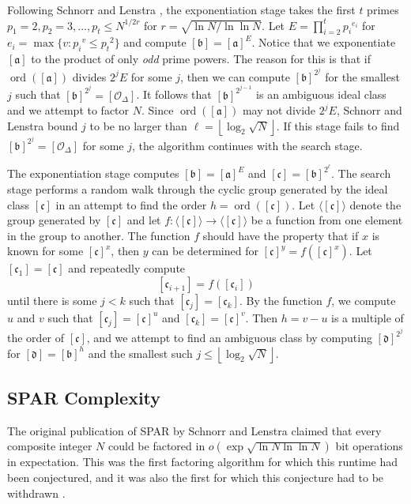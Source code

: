 \documentclass{ucalgthes1}
\theoremstyle{definition}
\DeclareMathOperator{\ord}{ord}
\newcommand{\floor}[1]{\left\lfloor #1 \right\rfloor}
\newcommand{\ideal}{\mathfrak}
\newcommand{\idealclass}[1]{\left[ \ideal #1 \right]}
\newcommand{\aclass}{\idealclass a}
\newcommand{\bclass}{\idealclass b}
\newcommand{\cclass}{\idealclass c}
\newcommand{\dclass}{\idealclass d}
\newcommand{\idclass}{[\mathcal O_\Delta]}
\begin{document}
Following Schnorr and Lenstra \cite{Schnorr1984}, the exponentiation stage takes the first $t$ primes $p_1 = 2, p_2 = 3, ..., p_t \le N^{1/2r}$ for $r = \sqrt{\ln N / \ln \ln N}$.  Let $E = \prod_{i=2}^t {p_i}^{e_i}$ for $e_i = \max \{ v : {p_i}^v \le {p_t}^2 \}$ and compute $\bclass = \aclass^E$.  Notice that we exponentiate $\aclass$ to the product of only \emph{odd} prime powers.  The reason for this is that if $\ord(\aclass)$ divides $2^j E$ for some $j$, then we can compute $\bclass^{2^j}$ for the smallest $j$ such that $\bclass^{2^j} = \idclass$.  It follows that $\bclass^{2^{j-1}}$ is an ambiguous ideal class and we attempt to factor $N$.  Since $\ord(\aclass)$ may not divide $2^jE$, Schnorr and Lenstra \cite[p.291]{Schnorr1984} bound $j$ to be no larger than $\ell = \floor{\log_2{\sqrt N}}$.  If this stage fails to find $\bclass^{2^j} = \idclass$ for some $j$, the algorithm continues with the search stage.

The exponentiation stage computes $\bclass = \aclass^E$ and $\cclass = \bclass^{2^\ell}$.  The search stage performs a random walk through the cyclic group generated by the ideal class $\cclass$ in an attempt to find the order $h = \ord(\cclass)$.  Let $\langle \cclass \rangle$ denote the group generated by $\cclass$ and let $f : \langle \cclass \rangle \rightarrow \langle \cclass \rangle$ be a function from one element in the group to another.  The function $f$ should have the property that if $x$ is known for some $\cclass ^x$, then $y$ can be determined for $\cclass^y = f(\cclass^x)$.  Let $[\mathfrak c_1] = \cclass$ and repeatedly compute
\[
	[\mathfrak c_{i+1}] = f([\mathfrak c_i])
\]
until there is some $j < k$ such that $[\mathfrak c_j] = [\mathfrak c_k]$.  By the function $f$, we compute $u$ and $v$ such that $[\mathfrak c_j]=\cclass^u$ and $[\mathfrak c_k]=\cclass^v$.  Then $h = v - u$ is a multiple of the order of $\cclass$, and we attempt to find an ambiguous class by computing $\dclass^{2^j}$ for $\dclass = \bclass^h$ and the smallest such $j \le \floor{\log_2{\sqrt N}}$.

\subsection{SPAR Complexity}

The original publication of SPAR by Schnorr and Lenstra \cite{Schnorr1984} claimed that every composite integer $N$ could be factored in $o\left(\exp\sqrt{\ln N \ln\ln N}\right)$ bit operations in expectation.  This was the first factoring algorithm for which this runtime had been conjectured, and it was also the first for which this conjecture had to be withdrawn \cite{Lenstra1992}.
\end{document}

